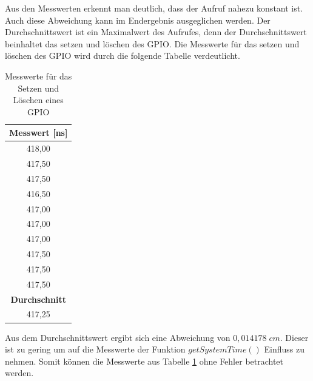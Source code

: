 Aus den Messwerten erkennt man deutlich, dass der Aufruf nahezu konstant ist. Auch diese Abweichung kann im Endergebnis ausgeglichen werden. Der Durchschnittswert ist ein Maximalwert des Aufrufes, denn der Durchschnittswert beinhaltet das setzen und löschen des GPIO. Die Messwerte für das setzen und löschen des GPIO wird durch die folgende Tabelle verdeutlicht.

\begin{table}[H]
\centering
\caption{Messwerte für das Setzen und Löschen eines GPIO}
\label{table:modul_E2}
\begin{tabular}{|c|}
\hline
\textbf{Messwert [\si{ns}]} \\ \hline
418,00                     \\ \hline
417,50                     \\ \hline
417,50                     \\ \hline
416,50                     \\ \hline
417,00                     \\ \hline
417,00                     \\ \hline
417,00                     \\ \hline
417,50                     \\ \hline
417,50                     \\ \hline
417,50                     \\ \hline
\textbf{Durchschnitt}      \\ \hline
417,25                     \\ \hline
\end{tabular}
\end{table}

Aus dem Durchschnittswert ergibt sich eine Abweichung von $0,014178 \; cm$. Dieser ist zu gering um auf die Messwerte der Funktion $getSystemTime()$ Einfluss zu nehmen. Somit können die Messwerte aus Tabelle \ref{table:modul_E2} ohne Fehler betrachtet werden.


